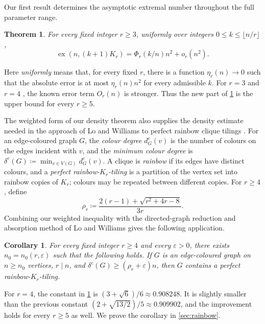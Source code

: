 \documentclass[10pt]{article}
\numberwithin{equation}{section}
\newtheorem{theorem}{Theorem}[section]
\newtheorem{corollary}[corollary]{Corollary}
\newcommand{\ex}{\operatorname{ex}}
\newcommand{\eps}{\varepsilon}
\begin{document}
Our first result determines the asymptotic extremal number throughout the full parameter range.

\begin{theorem}\label{thm:finite-density}
For every fixed integer $r\ge3$, uniformly over integers $0\le k\le\lfloor n/r\rfloor$,
\[
 \ex(n,(k+1)K_r)=\Phi_r\left(k/n\right)n^2+o_r(n^2).
\]
\end{theorem}

Here \emph{uniformly} means that, for every fixed $r$, there is a function $\eta_r(n)\to0$ such that the absolute error is at most $\eta_r(n)n^2$ for every admissible $k$.  For $r=3$ \cite{ABHP15} and $r=4$ \cite{HHLZ25}, the known error term $O_r(n)$ is stronger.  Thus the new part of \cref{thm:finite-density} is the upper bound for every $r\ge5$.

The weighted form of our density theorem also supplies the density estimate needed in the approach of Lo and Williams to perfect rainbow clique tilings \cite{LW24}.  For an edge-coloured graph $G$, the \emph{colour degree} $d_G^c(v)$ is the number of colours on the edges incident with $v$, and the \emph{minimum colour degree} is $\delta^c(G)\coloneqq\min_{v\in V(G)}d_G^c(v)$.  A clique is \emph{rainbow} if its edges have distinct colours, and a \emph{perfect rainbow-$K_r$-tiling} is a partition of the vertex set into rainbow copies of $K_r$; colours may be repeated between different copies.  For $r\ge4$, define
\begin{equation}\label{eq:rainbow-rho-intro}
 \rho_r\coloneqq\frac{2(r-1)+\sqrt{r^2+4r-8}}{3r}.
\end{equation}
Combining our weighted inequality with the directed-graph reduction and absorption method of Lo and Williams gives the following application.

\begin{corollary}\label{cor:rainbow-tiling}
For every fixed integer $r\ge4$ and every $\eps>0$, there exists $n_0=n_0(r,\eps)$ such that the following holds.  If $G$ is an edge-coloured graph on $n\ge n_0$ vertices, $r\mid n$, and $\delta^c(G)\ge(\rho_r+\eps)n$, then $G$ contains a perfect rainbow-$K_r$-tiling.
\end{corollary}

For $r=4$, the constant in \cref{cor:rainbow-tiling} is $(3+\sqrt6)/6\approx0.908248$.  It is slightly smaller than the previous constant $(2+\sqrt{13/2})/5\approx0.909902$, and the improvement holds for every $r\ge5$ as well.  We prove the corollary in \cref{sec:rainbow}.
\end{document}
